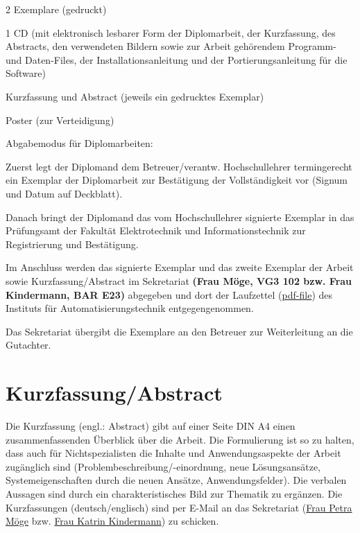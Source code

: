 \begin{compactitem}
  \item 2 Exemplare (gedruckt)
  \item 1 CD (mit elektronisch lesbarer Form der Diplomarbeit, der Kurzfassung, des Abstracts, den verwendeten Bildern sowie zur Arbeit gehörendem Programm- und Daten-Files, der Installationsanleitung und der Portierungsanleitung für die Software)
  \item Kurzfassung und Abstract (jeweils ein gedrucktes Exemplar)
  \item Poster (zur Verteidigung)
  \item Abgabemodus für Diplomarbeiten:
    \begin{compactitem}
      \item Zuerst legt der Diplomand dem Betreuer/verantw. Hochschullehrer termingerecht ein Exemplar der Diplomarbeit zur Bestätigung der Vollständigkeit vor (Signum und Datum auf Deckblatt).
      \item Danach bringt der Diplomand das vom Hochschullehrer signierte Exemplar in das Prüfungsamt der Fakultät Elektrotechnik und Informationstechnik zur Registrierung und Bestätigung.
      \item Im Anschluss werden das signierte Exemplar und das zweite Exemplar der Arbeit sowie Kurzfassung/Abstract im Sekretariat {\bfseries (Frau Möge, VG3 102 bzw. Frau Kindermann, BAR E23)}  abgegeben und dort der Laufzettel (\href{http://www.et.tu-dresden.de/ifa/fileadmin/user_upload/www_files/richtlinien_sa_da/DA-SA_Laufzettel.pdf}{pdf-file}) des Instituts für Automatisierungstechnik entgegengenommen.
    \end{compactitem}
\end{compactitem}

Das Sekretariat übergibt die Exemplare an den Betreuer zur Weiterleitung an die Gutachter.


\section{Kurzfassung/Abstract}
\label{sec:KurzfassungAbstract}

Die Kurzfassung (engl.: Abstract) gibt auf einer Seite DIN A4 einen zusammenfassenden Überblick über die Arbeit. Die Formulierung ist so zu halten, dass auch für Nichtspezialisten die Inhalte und Anwendungsaspekte der Arbeit zugänglich sind (Problembeschreibung/-einordnung, neue Lösungsansätze, Systemeigenschaften durch die neuen Ansätze, Anwendungsfelder). Die verbalen Aussagen sind durch ein charakteristisches Bild zur Thematik zu ergänzen.
Die Kurzfassungen (deutsch/englisch) sind per E-Mail an das Sekretariat (\href{http://www.et.tu-dresden.de/ifa/index.php?id=465&L=sjpkvkaajyiswhbo#c1214}{Frau Petra Möge} bzw. \href{http://www.et.tu-dresden.de/ifa/index.php?id=kk&L=sjpkvkaajyiswhbo}{Frau Katrin Kindermann}) zu schicken.

